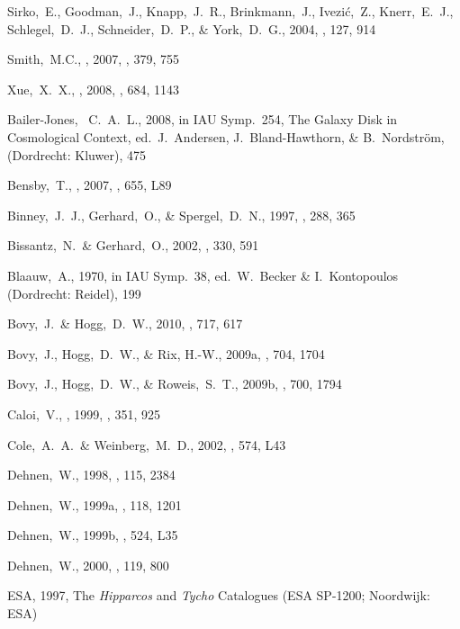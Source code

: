 \begin{thebibliography}{99}
 Sirko,~E., Goodman,~J., Knapp,~J.~R., Brinkmann,~J., Ivezi\'{c},~Z., Knerr,~E.~J., Schlegel,~D.~J., Schneider,~D.~P., \& York,~D.~G., 2004,
  \aj, 127, 914

 Smith,~M.C., \etal, 2007,
  \mnras, 379, 755

 Xue,~X.~X., \etal, 2008, 
  \apj, 684, 1143



  Bailer-Jones, ~C.~A.~L., 2008,
  in IAU Symp.~254, The Galaxy Disk in Cosmological Context, ed.~J.~Andersen, J.~Bland-Hawthorn, \& B.~Nordstr\"{o}m, (Dordrecht: Kluwer), 475  

  Bensby,~T., \etal, 2007,
  \apjl, 655, L89

  Binney,~J.~J., Gerhard,~O., \& Spergel,~D.~N., 1997,
  \mnras, 288, 365

  Bissantz,~N.~\& Gerhard,~O., 2002,
  \mnras, 330, 591

  Blaauw,~A., 1970, in IAU Symp.~38, ed.~W.~Becker \& I.~Kontopoulos (Dordrecht: Reidel), 199

 Bovy,~J.~\& Hogg,~D.~W., 2010,
  \apj, 717, 617

  Bovy,~J., Hogg,~D.~W., \& Rix, H.-W., 2009a,
  \apj, 704, 1704

 Bovy,~J., Hogg,~D.~W., \& Roweis,~S.~T., 2009b,
  \apj, 700, 1794

  Caloi,~V., \etal, 1999,
  \aap, 351, 925

  Cole,~A.~A.~\& Weinberg,~M.~D., 2002,
  \apjl, 574, L43

Dehnen,~W., 1998, \aj, 115, 2384

  Dehnen,~W., 1999a, \aj, 118, 1201

  Dehnen,~W., 1999b, \apj, 524, L35

  Dehnen,~W., 2000, \aj, 119, 800

{ESA}, 1997, {The \emph{Hipparcos} and \emph{Tycho} Catalogues} (ESA SP-1200; Noordwijk: ESA)


\end{thebibliography}
